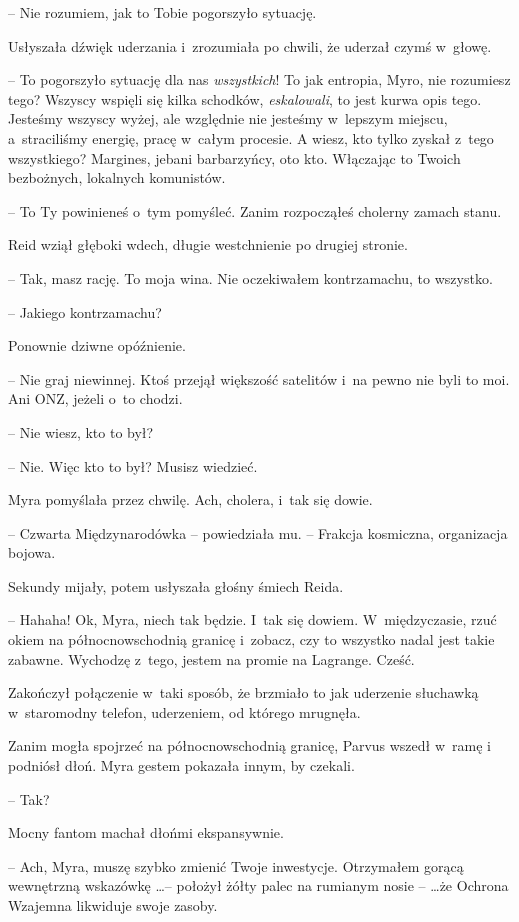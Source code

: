 \documentclass[oneside,polish,11pt,sfheadings]{mwbk}
\begin{document}
-- Nie rozumiem, jak to Tobie pogorszyło sytuację.

Usłyszała dźwięk uderzania i~zrozumiała po chwili, że uderzał czymś w~głowę.

-- To pogorszyło sytuację dla nas\textit{ wszystkich}! To jak entropia,
Myro, nie rozumiesz tego? Wszyscy wspięli się kilka schodków,
\textit{eskalowali}, to jest kurwa opis tego. Jesteśmy wszyscy wyżej, ale
względnie nie jesteśmy w~lepszym miejscu, a~straciliśmy energię, pracę w~całym procesie. A wiesz, kto tylko zyskał z~tego wszystkiego? Margines,
jebani barbarzyńcy, oto kto. Włączając to Twoich bezbożnych, lokalnych
komunistów.

-- To Ty powinieneś o~tym pomyśleć. Zanim rozpocząłeś cholerny zamach
stanu.

Reid wziął głęboki wdech, długie westchnienie po drugiej stronie.

-- Tak, masz rację. To moja wina. Nie oczekiwałem kontrzamachu, to
wszystko.

-- Jakiego kontrzamachu?

Ponownie dziwne opóźnienie.

-- Nie graj niewinnej. Ktoś przejął większość satelitów i~na pewno nie
byli to moi. Ani ONZ, jeżeli o~to chodzi.

-- Nie wiesz, kto to był?

-- Nie. Więc kto to był? Musisz wiedzieć.

Myra pomyślała przez chwilę. Ach, cholera, i~tak się dowie.

-- Czwarta Międzynarodówka -- powiedziała mu. -- Frakcja kosmiczna,
organizacja bojowa.

Sekundy mijały, potem usłyszała głośny śmiech Reida. 

-- Hahaha! Ok, Myra,
niech tak będzie. I~tak się dowiem. W~międzyczasie, rzuć okiem na
północno\dywiz wschodnią granicę i~zobacz, czy to wszystko nadal jest takie
zabawne. Wychodzę z~tego, jestem na promie na Lagrange. Cześć.

Zakończył połączenie w~taki sposób, że brzmiało to jak uderzenie
słuchawką w~staromodny telefon, uderzeniem, od którego mrugnęła.

Zanim mogła spojrzeć na północno\dywiz wschodnią granicę, Parvus wszedł w~ramę
i podniósł dłoń. Myra gestem pokazała innym, by czekali.

-- Tak?

Mocny fantom machał dłońmi ekspansywnie. 

-- Ach, Myra, muszę szybko
zmienić Twoje inwestycje. Otrzymałem gorącą wewnętrzną wskazówkę \ldots -- położył żółty palec na rumianym nosie -- \ldots że Ochrona Wzajemna
likwiduje swoje zasoby.
\end{document}
